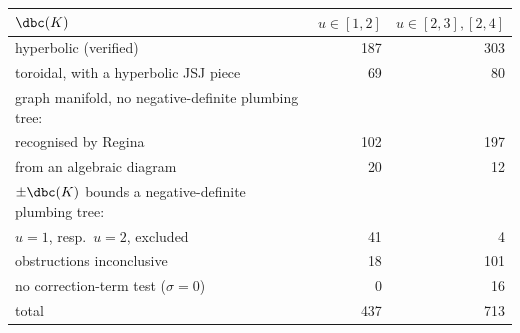 \begin{tabular}{lrr}
\toprule
$\dbc(K)$ & $u\in[1,2]$ & $u\in[2,3],[2,4]$\\
\midrule
hyperbolic (verified) & 187 & 303\\
toroidal, with a hyperbolic JSJ piece & 69 & 80\\
graph manifold, no negative-definite plumbing tree: & & \\
\quad recognised by Regina & 102 & 197\\
\quad from an algebraic diagram & 20 & 12\\
$\pm\dbc(K)$ bounds a negative-definite plumbing tree: & & \\
\quad $u=1$, resp.\ $u=2$, excluded & 41 & 4\\
\quad obstructions inconclusive & 18 & 101\\
\quad no correction-term test ($\sigma=0$) & 0 & 16\\
\midrule
total & 437 & 713\\
\bottomrule
\end{tabular}
